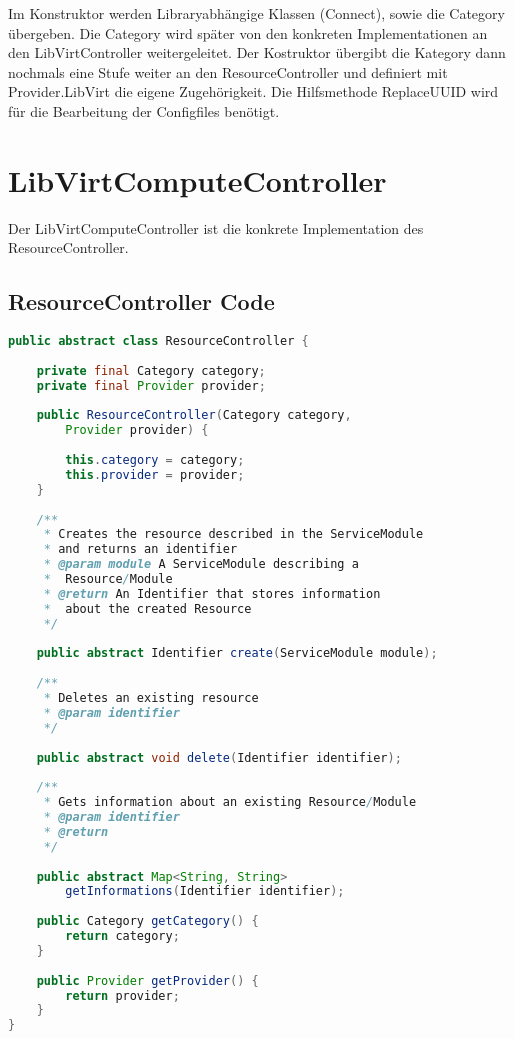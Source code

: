 \subsubsection{}
Im Konstruktor werden Libraryabhängige Klassen (Connect), sowie die Category übergeben. Die Category wird später von den konkreten Implementationen an den LibVirtController weitergeleitet. Der Kostruktor übergibt die Kategory dann nochmals eine Stufe weiter an den ResourceController und definiert mit Provider.LibVirt die eigene Zugehörigkeit.
Die Hilfsmethode ReplaceUUID wird für die Bearbeitung der Configfiles benötigt.

\newpage
\section{LibVirtComputeController}
Der LibVirtComputeController ist die konkrete Implementation des ResourceController.

\subsection{ResourceController Code}
\begin{lstlisting}[language=Java,frame=single,caption={ResourceController Code}] 
public abstract class ResourceController {
	
	private final Category category;
	private final Provider provider;
	
	public ResourceController(Category category, 
		Provider provider) {
		
		this.category = category;
		this.provider = provider;
	}
	
	/**
	 * Creates the resource described in the ServiceModule
	 * and returns an identifier
	 * @param module A ServiceModule describing a 
	 *	Resource/Module
	 * @return An Identifier that stores information 
	 *	about the created Resource
	 */
	
	public abstract Identifier create(ServiceModule module);
	
	/**
	 * Deletes an existing resource
	 * @param identifier 
	 */
	
	public abstract void delete(Identifier identifier);
	
	/**
	 * Gets information about an existing Resource/Module
	 * @param identifier
	 * @return 
	 */
	
	public abstract Map<String, String> 
		getInformations(Identifier identifier);
	
	public Category getCategory() {
		return category;
	}
	
	public Provider getProvider() {
		return provider;
	}
}
\end{lstlisting}
